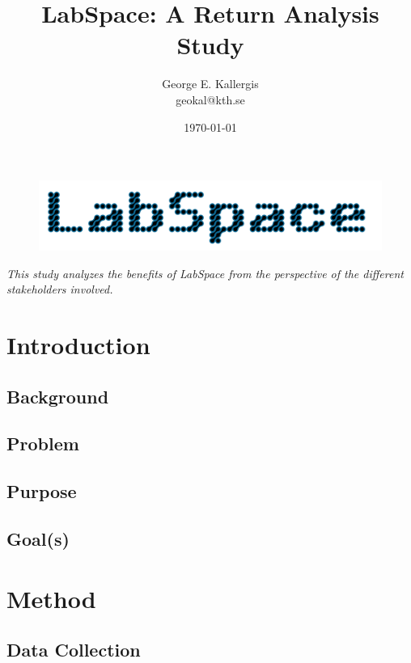 \documentclass[a4paper, 11pt]{article}
\title{LabSpace: A Return Analysis Study}
\author{George E. Kallergis\\geokal@kth.se}
\date{\today{}}
\begin{document}
\maketitle

\begin{figure}[h!]
  \begin{center}
    \includegraphics[width=\textwidth,height=\textheight,keepaspectratio]{imagery/logo.png}
    \label{fig:dneaf}
  \end{center}
\end{figure}

\textit{This study analyzes the benefits of LabSpace from the perspective of the different stakeholders involved.}

\newpage

\section{Introduction}

\subsection{Background}

\subsection{Problem}

\subsection{Purpose}

\subsection{Goal(s)}

\section{Method}

\subsection{Data Collection}
\end{document}

